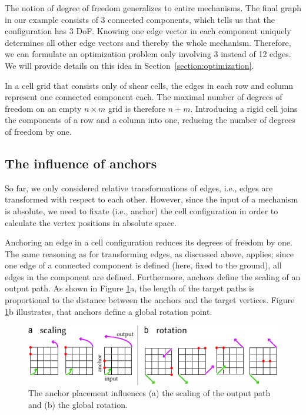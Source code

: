 The notion of degree of freedom generalizes to entire mechanisms. The final graph in our example consists of 3 connected components, which tells us that the configuration has 3 DoF. Knowing one edge vector in each component uniquely determines all other edge vectors and thereby the whole mechanism. Therefore, we can formulate an optimization problem only involving 3 instead of 12 edges. We will provide details on this idea in Section~\ref{section:optimization}. 

In a cell grid that consists only of shear cells, the edges in each row and column represent one connected component each. The maximal number of degrees of freedom on an empty $n \times m$ grid is therefore $n+m$. Introducing a rigid cell joins the components of a row and a column into one, reducing the number of degrees of freedom by one.


\subsection{The influence of anchors}

So far, we only considered relative transformations of edges, i.e., edges are transformed with respect to each other. However, since the input of a mechanism is absolute, we need to fixate (i.e., anchor) the cell configuration in order to calculate the vertex positions in absolute space. 

Anchoring an edge in a cell configuration reduces its degrees of freedom by one. The same reasoning as for transforming edges, as discussed above, applies; since one edge of a connected component is defined (here, fixed to the ground), all edges in the component are defined. Furthermore, anchors define the scaling of an output path. As shown in Figure \ref{fig:9-anchor-effects}a, the length of the target paths is proportional to the distance between the anchors and the target vertices. Figure \ref{fig:9-anchor-effects}b illustrates, that anchors define a global rotation point.

\begin{figure} [h]
    \includegraphics[width=\textwidth]{chapters/understanding-metamaterial-mechanisms-FIG/9-anchor-effects.pdf}
    \caption[Short figure name.]{The anchor placement influences (a) the scaling of the output path and (b) the global rotation. 
    \label{fig:9-anchor-effects}}
\end{figure}


